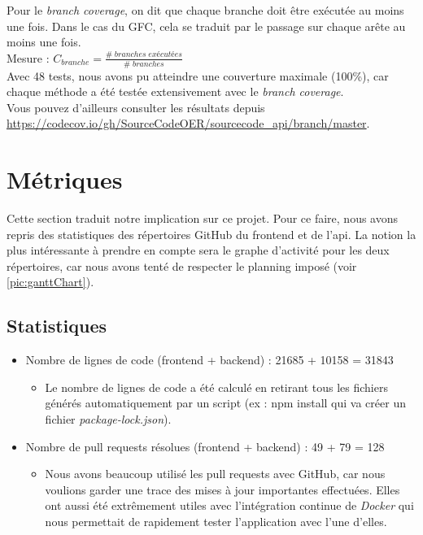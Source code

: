 Pour le \textit{branch coverage}, on dit que chaque branche doit être exécutée au moins une fois. Dans le cas du GFC, cela se traduit par le passage sur chaque arête au moins une fois.\\

Mesure : $ C_{branche} =  \frac{\# \; branches \; exécutées}{\# \; branches}  $\\

Avec 48 tests, nous avons pu atteindre une couverture maximale (100\%), car chaque méthode a été testée extensivement avec le \textit{branch coverage}.\\

Vous pouvez d'ailleurs consulter les résultats depuis \url{https://codecov.io/gh/SourceCodeOER/sourcecode_api/branch/master}.



\section{Métriques}

Cette section traduit notre implication sur ce projet. Pour ce faire, nous avons repris des statistiques des répertoires GitHub du \gls{frontend} et de l'\gls{api}. La notion la plus intéressante à prendre en compte sera le graphe d'activité pour les deux répertoires, car nous avons tenté de respecter le planning imposé (voir \ref{pic:ganttChart}).

\subsection{Statistiques}

\begin{itemize}
    \item Nombre de lignes de code (frontend + backend) : 21685 + 10158 = 31843
    \begin{itemize}
        \item Le nombre de lignes de code a été calculé en retirant tous les fichiers générés automatiquement par un script (ex : npm install qui va créer un fichier \textit{package-lock.json}).
    \end{itemize}
    \item Nombre de pull requests résolues (frontend + backend) : 49 + 79 = 128
    \begin{itemize}
        \item Nous avons beaucoup utilisé les pull requests avec GitHub, car nous voulions garder une trace des mises à jour importantes effectuées. Elles ont aussi été extrêmement utiles avec l'intégration continue de \textit{Docker} qui nous permettait de rapidement tester l'application avec l'une d'elles.
    \end{itemize}
\end{itemize}

